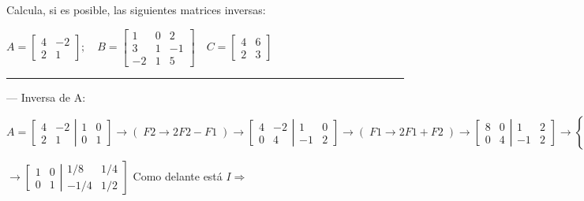 \begin{ejem}
Calcula, si es posible, las siguientes matrices inversas:

$A=\left[\begin{matrix} 4&-2\\2&1  \end{matrix}\right]; \quad 
B=\left[\begin{matrix} 1&0&2\\3&1&-1\\-2&1&5  \end{matrix}\right] \quad 
C=\left[\begin{matrix} 4&6\\2&3  \end{matrix}\right]$

\rule{5cm}{0.2pt}


--- Inversa de A:

$A=\left[\begin{matrix} 4&-2\\2&1  \end{matrix}\right|
\left. \begin{matrix}1&0\\0&1\end{matrix} \right] \to (\; F2\to 2F2-F1\;) \to 
\left[\begin{matrix} 4&-2\\0&4  \end{matrix}\right|
\left. \begin{matrix}1&0\\-1&2\end{matrix} \right] \to 
(\;F1\to 2F1+F2 \;) \to 
\left[\begin{matrix} 8&0\\0&4  \end{matrix}\right|
\left. \begin{matrix}1&2\\-1&2\end{matrix} \right] \to \begin{cases} \; F1\to F1/8 \\ F2\to F2/4\end{cases} \to $

$\to \left[\begin{matrix} 1&0\\0&1  \end{matrix}\right|
\left. \begin{matrix}1/8&1/4\\-1/4&1/2\end{matrix} \right]$ Como delante está $I \Rightarrow $


\end{ejem}
